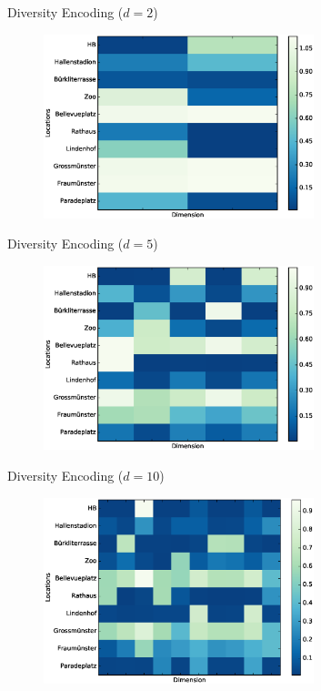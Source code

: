 \documentclass{beamer}
\begin{document}
  \begin{frame}{Diversity Encoding ($d=2$)}
    \begin{figure}
      \includegraphics[width=0.7\textwidth]{submodular_weights_d_2}
    \end{figure}
  \end{frame}
  
  \begin{frame}{Diversity Encoding ($d=5$)}
    \begin{figure}
      \includegraphics[width=0.7\textwidth]{submodular_weights_d_5}
    \end{figure}
  \end{frame}
  
  \begin{frame}{Diversity Encoding ($d=10$)}
    \begin{figure}
      \includegraphics[width=0.7\textwidth]{submodular_weights_d_10}
    \end{figure}
  \end{frame}
  
\end{document}
